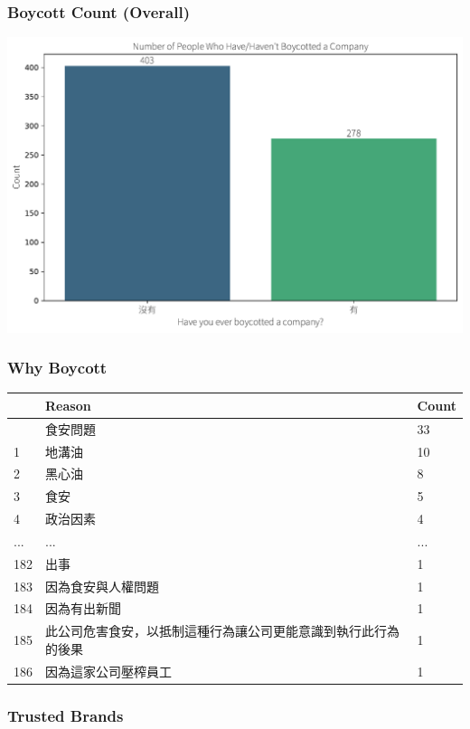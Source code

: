 \documentclass[
  letterpaper,
  DIV=11,
  numbers=noendperiod]{scrartcl}
\begin{document}
\subsubsection{Boycott Count (Overall)}\label{boycott-count-overall}

\includegraphics{_thesis_files/figure-pdf/cell-61-output-1.pdf}

\subsubsection{Why Boycott}\label{why-boycott}

\begin{longtable}[]{@{}lll@{}}
\toprule\noalign{}
& Reason & Count \\
\midrule\noalign{}
\endhead
\bottomrule\noalign{}
\endlastfoot
0 & 食安問題 & 33 \\
1 & 地溝油 & 10 \\
2 & 黑心油 & 8 \\
3 & 食安 & 5 \\
4 & 政治因素 & 4 \\
... & ... & ... \\
182 & 出事 & 1 \\
183 & 因為食安與人權問題 & 1 \\
184 & 因為有出新聞 & 1 \\
185 & 此公司危害食安，以抵制這種行為讓公司更能意識到執行此行為的後果 &
1 \\
186 & 因為這家公司壓榨員工 & 1 \\
\end{longtable}

\subsubsection{Trusted Brands}\label{trusted-brands}
\end{document}
